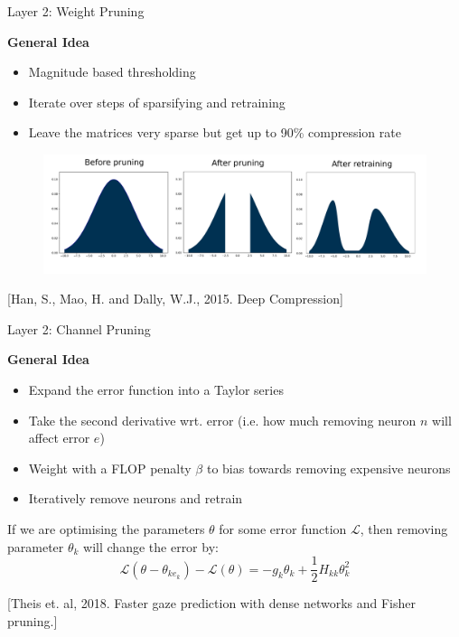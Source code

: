 \documentclass[xcolor=dvipsnames]{beamer}
\begin{document}
\begin{frame}{Layer 2: Weight Pruning}

{\large\textbf{General Idea}}

\begin{itemize}
    \item Magnitude based thresholding 
    \item Iterate over steps of sparsifying and retraining 
    \item Leave the matrices very sparse but get up to 90\% compression rate
\end{itemize}

\begin{figure}
    \centering
    \includegraphics[width=\linewidth]{images/prune_retrain.pdf}
\end{figure}

{\footnotesize [Han, S., Mao, H. and Dally, W.J., 2015. Deep Compression]}
    
\end{frame}


\begin{frame}{Layer 2: Channel Pruning}
    
{\large\textbf{General Idea}}
\begin{itemize}
    \item Expand the error function into a Taylor series
    \item Take the second derivative wrt. error (i.e. how much removing neuron $n$ will affect error $e$)
    \item Weight with a FLOP penalty $\beta$ to bias towards removing expensive neurons
    \item Iteratively remove neurons and retrain
\end{itemize}

If we are optimising the parameters $\theta$ for some error function $\mathcal{L}$, then removing parameter $\theta_{k}$ will change the error by:
\begin{equation}
    \mathcal{L}(\theta - \theta_{ke_{k}}) - \mathcal{L}(\theta) = -g_{k}\theta_{k} + \frac{1}{2}H_{kk}\theta^2_{k}
\end{equation}

{\footnotesize [Theis et. al, 2018. Faster gaze prediction with dense networks and Fisher pruning.]}
    
\end{frame}
\end{document}
